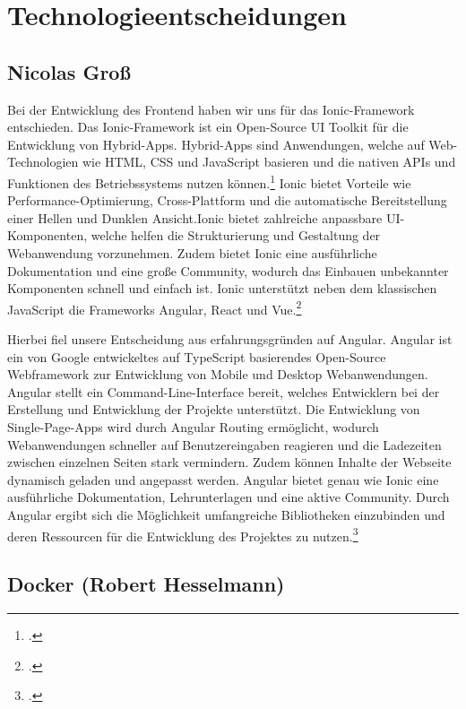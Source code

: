 
\section{Technologieentscheidungen}

\subsection*{Nicolas Groß}

Bei der Entwicklung des Frontend haben wir uns für das Ionic-Framework entschieden. Das Ionic-Framework ist ein Open-Source UI Toolkit für die Entwicklung von Hybrid-Apps. Hybrid-Apps sind Anwendungen, welche auf Web-Technologien wie HTML, CSS und JavaScript basieren und die nativen APIs und Funktionen des Betriebssystems nutzen können.\footcite[.vgl]{HybrideWebApp}  Ionic bietet Vorteile wie Performance-Optimierung, Cross-Plattform und die automatische Bereitstellung einer Hellen und Dunklen Ansicht.Ionic bietet zahlreiche anpassbare UI-Komponenten, welche helfen die Strukturierung und Gestaltung der Webanwendung vorzunehmen. Zudem bietet Ionic eine ausführliche Dokumentation und eine große Community, wodurch das Einbauen unbekannter Komponenten schnell und einfach ist. Ionic unterstützt neben dem klassischen JavaScript die Frameworks Angular, React und Vue.\footcite[.vgl]{Ionic2013}

Hierbei fiel unsere Entscheidung aus erfahrungsgründen auf Angular. Angular ist ein von Google entwickeltes auf TypeScript basierendes Open-Source Webframework zur Entwicklung von Mobile und Desktop Webanwendungen. Angular stellt ein Command-Line-Interface bereit, welches Entwicklern bei der Erstellung und Entwicklung der Projekte unterstützt. Die Entwicklung von Single-Page-Apps wird durch Angular Routing ermöglicht, wodurch Webanwendungen schneller auf Benutzereingaben reagieren und die Ladezeiten zwischen einzelnen Seiten stark vermindern. Zudem können Inhalte der Webseite dynamisch geladen und angepasst werden. Angular bietet genau wie Ionic eine ausführliche Dokumentation, Lehrunterlagen und eine aktive Community. Durch Angular ergibt sich die Möglichkeit umfangreiche Bibliotheken einzubinden und deren Ressourcen für die Entwicklung des Projektes zu nutzen.\footcite[.vgl]{Angular2016}


\subsection*{Docker (Robert Hesselmann)}

